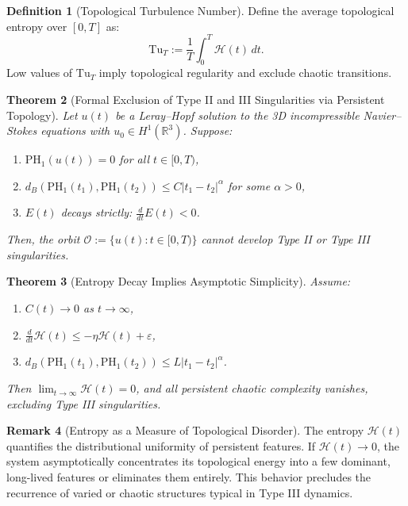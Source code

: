 \documentclass[11pt]{article}
\newtheorem{theorem}{Theorem}[section]
\theoremstyle{definition}
\newtheorem{definition}[theorem]{Definition}
\newtheorem{remark}[theorem]{Remark}
\begin{document}
\begin{definition}[Topological Turbulence Number]
Define the average topological entropy over $[0,T]$ as:
\[
\mathrm{Tu}_T := \frac{1}{T} \int_0^T \mathcal{H}(t) \, dt.
\]
Low values of $\mathrm{Tu}_T$ imply topological regularity and exclude chaotic transitions.
\end{definition}

\begin{theorem}[Formal Exclusion of Type II and III Singularities via Persistent Topology]
\label{thm:formal_typeII_III_exclusion}
Let $u(t)$ be a Leray--Hopf solution to the 3D incompressible Navier--Stokes equations with $u_0 \in H^1(\mathbb{R}^3)$. Suppose:
\begin{enumerate}
    \item $\mathrm{PH}_1(u(t)) = 0$ for all $t \in [0, T)$,
    \item $d_B(\mathrm{PH}_1(t_1), \mathrm{PH}_1(t_2)) \le C |t_1 - t_2|^\alpha$ for some $\alpha > 0$,
    \item $E(t)$ decays strictly: $\frac{d}{dt} E(t) < 0$.
\end{enumerate}
Then, the orbit $\mathcal{O} := \{u(t): t \in [0,T)\}$ cannot develop Type II or Type III singularities.
\end{theorem}

\begin{theorem}[Entropy Decay Implies Asymptotic Simplicity]
Assume:
\begin{enumerate}
    \item $C(t) \to 0$ as $t \to \infty$,
    \item $\frac{d}{dt} \mathcal{H}(t) \le -\eta \mathcal{H}(t) + \varepsilon$,
    \item $d_B(\mathrm{PH}_1(t_1), \mathrm{PH}_1(t_2)) \le L|t_1 - t_2|^\alpha$.
\end{enumerate}
Then $\lim_{t \to \infty} \mathcal{H}(t) = 0$, and all persistent chaotic complexity vanishes, excluding Type III singularities.
\end{theorem}

\begin{remark}[Entropy as a Measure of Topological Disorder]
The entropy $\mathcal{H}(t)$ quantifies the distributional uniformity of persistent features. If $\mathcal{H}(t) \to 0$, the system asymptotically concentrates its topological energy into a few dominant, long-lived features or eliminates them entirely. This behavior precludes the recurrence of varied or chaotic structures typical in Type III dynamics.
\end{remark}
\end{document}
